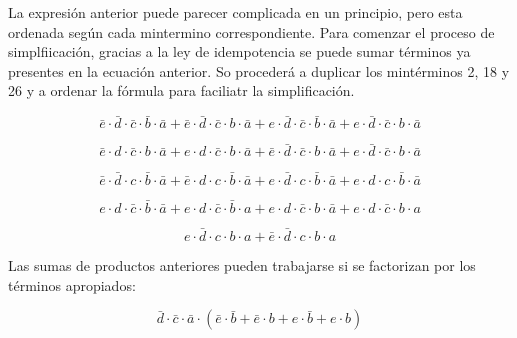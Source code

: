 La expresión anterior puede parecer complicada en un principio, pero esta ordenada según cada mintermino correspondiente. Para comenzar el proceso de simplfiicación, gracias a la ley de idempotencia se puede sumar términos ya presentes en la ecuación anterior. So procederá a duplicar los mintérminos 2, 18 y 26 y a ordenar la fórmula para faciliatr la simplificación. 

\begin{equation}
\bar{e} \cdot \bar{d} \cdot \bar{c} \cdot \bar{b} \cdot \bar{a} +  %
\bar{e} \cdot \bar{d} \cdot \bar{c} \cdot b \cdot \bar{a} +        %
e \cdot \bar{d} \cdot \bar{c} \cdot \bar{b} \cdot \bar{a} +    	  %
e \cdot \bar{d} \cdot \bar{c} \cdot b \cdot \bar{a}  	          %
\end{equation}

\begin{equation}
\bar{e} \cdot d \cdot \bar{c} \cdot b \cdot \bar{a} + 		      %
e \cdot d \cdot \bar{c} \cdot b \cdot \bar{a} + 	                  %
\bar{e} \cdot \bar{d} \cdot \bar{c} \cdot b \cdot \bar{a} +        %
e \cdot \bar{d} \cdot \bar{c} \cdot b \cdot \bar{a}  	          %
\end{equation}

\begin{equation}
\bar{e} 	\cdot \bar{d} \cdot c \cdot \bar{b} \cdot \bar{a} +	      %
\bar{e} \cdot d \cdot c \cdot \bar{b} \cdot \bar{a} + 			  %
e \cdot \bar{d} \cdot c \cdot \bar{b} \cdot \bar{a} + 		      %
e \cdot d \cdot c \cdot \bar{b} \cdot \bar{a}                      %
\end{equation}

\begin{equation}
e \cdot d \cdot \bar{c} \cdot \bar{b} \cdot \bar{a} +              %
e \cdot d \cdot \bar{c} \cdot \bar{b} \cdot a +                    %
e \cdot d \cdot \bar{c} \cdot b \cdot \bar{a} + 	                  %
e \cdot d \cdot \bar{c} \cdot b \cdot a                           %
\end{equation}

\begin{equation}
e \cdot \bar{d} \cdot c \cdot b \cdot a +                          %
\bar{e} \cdot \bar{d} \cdot c \cdot b \cdot a  			          %
\end{equation}

Las sumas de productos anteriores pueden trabajarse si se factorizan por los términos apropiados:

\begin{equation}\label{eq:minterm_0_2_16_18}
\bar{d} \cdot \bar{c} \cdot \bar{a} \cdot (\bar{e} \cdot \bar{b} + \bar{e} \cdot b + e \cdot \bar{b} + e \cdot b)
\end{equation}

